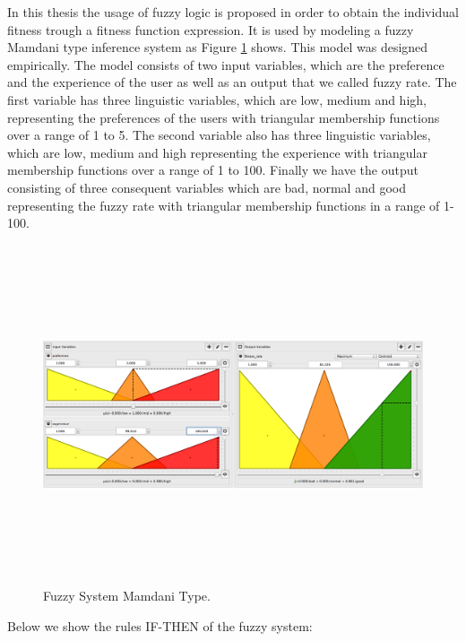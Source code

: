 In this thesis the usage of fuzzy logic is proposed \cite{Zadeh1973} in order to
obtain the individual fitness trough a fitness function expression. It is
used by modeling a fuzzy Mamdani type inference system \cite{mamdani1975experiment} \cite{mamdani1974application} as Figure
\ref{fig:fis01} shows. This model was designed empirically. The model consists
of two input variables, which are the preference and the experience of the user
as well as an output that we called fuzzy rate. The first variable has three
linguistic variables, which are low, medium and high, representing the
preferences of the users with triangular membership functions over a range of 1
to 5. The second variable also has three linguistic variables, which are low, medium
and high representing the experience with triangular membership functions over a
range of 1 to 100. Finally we have the output consisting of three consequent
variables which are bad, normal and good representing the fuzzy rate with triangular
membership functions in a range of 1-100.
\begin{figure}
\captionsetup{justification=centering,margin=2cm}
\centering
\setlength\fboxsep{0pt}
\setlength\fboxrule{0.7pt}
\includegraphics[width=12cm,height=10cm,keepaspectratio]{img/fuzzy_system_2_1.png}
\caption{Fuzzy System Mamdani Type.}
\label{fig:fis01}
\end{figure}

Below we show the rules IF-THEN of the fuzzy system:

